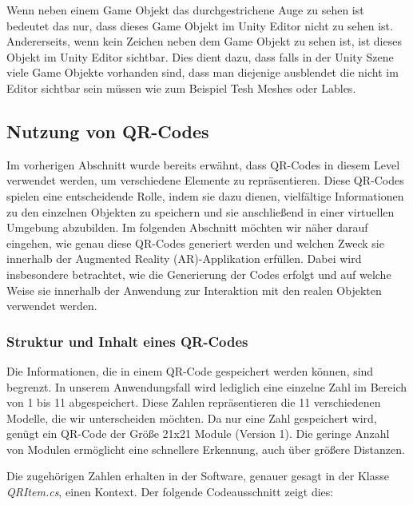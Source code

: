 Wenn neben einem Game Objekt das durchgestrichene Auge zu sehen ist bedeutet das nur, dass dieses Game Objekt im Unity Editor nicht zu sehen ist. Andererseits, wenn kein Zeichen
neben dem Game Objekt zu sehen ist, ist dieses Objekt im Unity Editor sichtbar. Dies dient dazu, dass falls in der Unity Szene viele Game Objekte vorhanden sind, dass man
diejenige ausblendet die nicht im Editor sichtbar sein müssen wie zum Beispiel Tesh Meshes oder Lables.

\subsection{Nutzung von QR-Codes} 
Im vorherigen Abschnitt wurde bereits erwähnt, dass QR-Codes in diesem Level verwendet werden, um verschiedene Elemente
zu repräsentieren. Diese QR-Codes spielen eine entscheidende Rolle, indem sie dazu dienen, vielfältige Informationen zu
den einzelnen Objekten zu speichern und sie anschließend in einer virtuellen Umgebung abzubilden. Im folgenden Abschnitt
möchten wir näher darauf eingehen, wie genau diese QR-Codes generiert werden und welchen Zweck sie innerhalb der
Augmented Reality (AR)-Applikation erfüllen. Dabei wird insbesondere betrachtet, wie die Generierung der Codes erfolgt
und auf welche Weise sie innerhalb der Anwendung zur Interaktion mit den realen Objekten verwendet werden.

\subsubsection{Struktur und Inhalt eines QR-Codes}
Die Informationen, die in einem QR-Code gespeichert werden können, sind begrenzt. In unserem Anwendungsfall wird lediglich
eine einzelne Zahl im Bereich von 1 bis 11 abgespeichert. Diese Zahlen repräsentieren die 11 verschiedenen Modelle, die
wir unterscheiden möchten. Da nur eine Zahl gespeichert wird, genügt ein QR-Code der Größe 21x21 Module (Version 1). Die
geringe Anzahl von Modulen ermöglicht eine schnellere Erkennung, auch über größere Distanzen.

Die zugehörigen Zahlen erhalten in der Software, genauer gesagt in der Klasse \textit{QRItem.cs}, einen Kontext. Der folgende Codeausschnitt zeigt dies:

